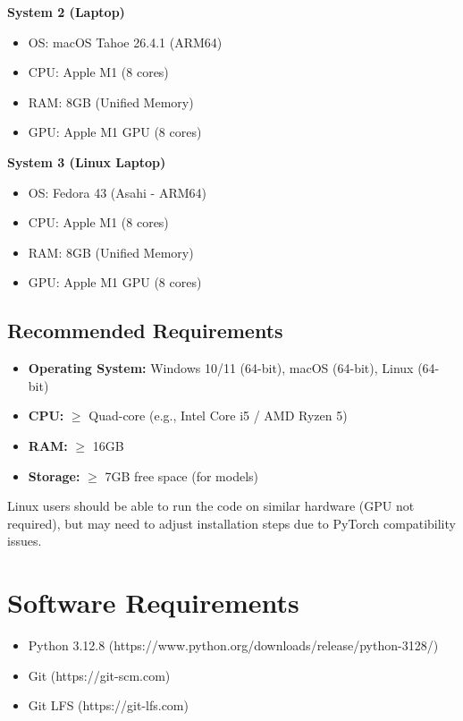 \documentclass{article}
\begin{document}
\textbf{System 2 (Laptop)}
\begin{itemize}
    \item OS: macOS Tahoe 26.4.1 (ARM64)
    \item CPU: Apple M1 (8 cores)
    \item RAM: 8GB (Unified Memory)
    \item GPU: Apple M1 GPU (8 cores)
\end{itemize}

\textbf{System 3 (Linux Laptop)}
\begin{itemize}
    \item OS: Fedora 43 (Asahi - ARM64)
    \item CPU: Apple M1 (8 cores)
    \item RAM: 8GB (Unified Memory)
    \item GPU: Apple M1 GPU (8 cores)
\end{itemize}

\subsection*{Recommended Requirements}

\begin{itemize}
    \item \textbf{Operating System:} Windows 10/11 (64-bit), macOS (64-bit), Linux (64-bit)
    \item \textbf{CPU:} $\geq$ Quad-core (e.g., Intel Core i5 / AMD Ryzen 5)
    \item \textbf{RAM:} $\geq$ 16GB
    \item \textbf{Storage:} $\geq$ 7GB free space (for models)
\end{itemize}


Linux users should be able to run the code on similar hardware (GPU not required), but may need to adjust installation steps due to PyTorch compatibility issues.




\section*{Software Requirements}
\begin{itemize}
    \item Python 3.12.8 (https://www.python.org/downloads/release/python-3128/)
    \item Git (https://git-scm.com)
    \item Git LFS (https://git-lfs.com)
\end{itemize}
\end{document}
